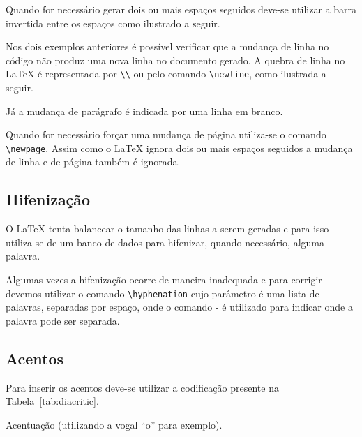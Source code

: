 Quando for necessário gerar dois ou mais espaços seguidos deve-se utilizar a
barra invertida entre os espaços como ilustrado a seguir. \\

Nos dois exemplos anteriores é possível verificar que a mudança de linha no
código não produz uma nova linha no documento gerado. A
quebra de linha no LaTeX é representada por \lstinline!\\! ou pelo comando
\lstinline!\newline!, como ilustrada
a seguir. \\

Já a mudança de parágrafo é indicada por uma linha em
branco. 

Quando for necessário forçar uma mudança de página utiliza-se o comando
\lstinline!\newpage!. Assim como o
LaTeX ignora dois ou mais espaços seguidos a mudança de linha e de página também
é ignorada.

\subsection{Hifenização}
O LaTeX tenta balancear o tamanho das linhas a serem geradas e para isso
utiliza-se de um banco de dados para hifenizar, quando necessário, alguma
palavra.

Algumas vezes a hifenização ocorre de maneira
inadequada e para corrigir devemos utilizar o comando
\lstinline!\hyphenation!
cujo parâmetro é uma lista de palavras, separadas por espaço, onde o comando - é
utilizado para indicar onde a palavra pode ser separada.

\subsection{Acentos}
Para inserir os acentos deve-se utilizar a codificação presente na
Tabela~\ref{tab:diacritic}.
\begin{table}[!htb]
  \centering
  \caption{Acentuação (utilizando a vogal ``o'' para exemplo).} \label{tab:diacritic}
  
\end{table}

